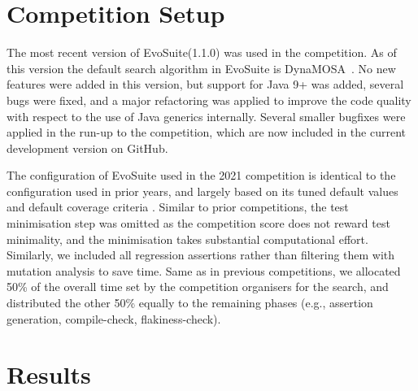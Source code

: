 \documentclass[10pt,conference]{IEEEtran}
\newcommand{\EVOSUITE}{{\sc EvoSuite}\xspace}
\begin{document}





\section{Competition Setup}


The most recent version of \EVOSUITE (1.1.0) was used in the competition. As of
this version the default search algorithm in \EVOSUITE is
DynaMOSA~\cite{dynamosa}. No new features were added in this version, but
support for Java 9+ was added, several bugs were fixed, and a major refactoring
was applied to improve the code quality with respect to the use of Java
generics internally. Several smaller bugfixes were applied in the run-up to the
competition, which are now included in the current development version on
GitHub.

The configuration of \EVOSUITE used in the 2021 competition is identical to the
configuration used in prior years, and largely based on its tuned default
values~\cite{arcuri2013parameter} and default coverage criteria
\cite{rojas2015combining}.
%
Similar to prior competitions, the test minimisation step was omitted as the competition score does not reward test minimality, and the minimisation takes substantial computational effort. Similarly, we included all regression assertions rather than filtering them with mutation analysis to save time. 
%
Same as in previous competitions, we allocated 50\% of
the overall time set by the competition organisers for the search, and
distributed the other 50\% equally to the remaining phases (e.g., assertion generation, compile-check, flakiness-check).



\section{Results}
\end{document}

